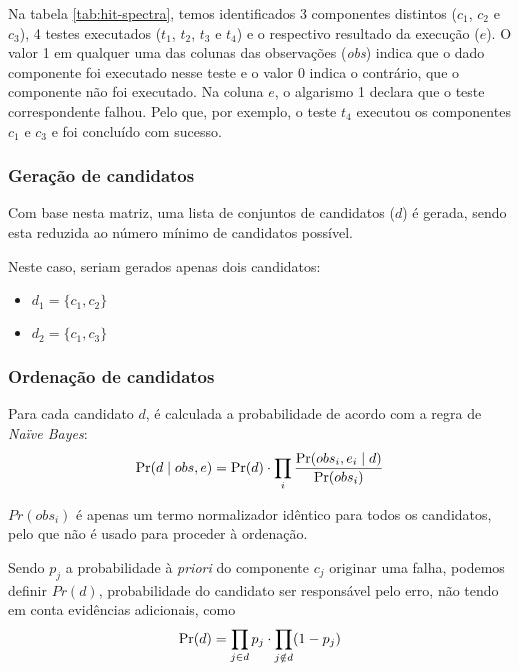 Na tabela \ref{tab:hit-spectra}, temos identificados 3 componentes distintos ($c_1$, $c_2$ e $c_3$), 4 testes executados ($t_1$, $t_2$, $t_3$ e $t_4$) e o respectivo resultado da execução ($e$). O valor 1 em qualquer uma das colunas das observações (\emph{obs}) indica que o dado componente foi executado nesse teste e o valor 0 indica o contrário, que o componente não foi executado. Na coluna $e$, o algarismo 1 declara que o teste correspondente falhou. 
Pelo que, por exemplo, o teste $t_4$ executou os componentes $c_1$ e $c_3$ e foi concluído com sucesso.


% 
%

\subsubsection{Geração de candidatos} 

Com base nesta matriz, uma lista de conjuntos de candidatos ($d$) é gerada, sendo esta reduzida ao número mínimo de candidatos possível. 

Neste caso, seriam gerados apenas dois candidatos:

\begin{itemize}
\item $d_1 = \{c_1, c_2\}$ 
\item $d_2 = \{c_1, c_3\}$ 
\end{itemize}

% 
%

\subsubsection{Ordenação de candidatos} 

Para cada candidato $d$, é calculada a probabilidade de acordo com a regra de \emph{Naïve Bayes}:
%
\begin{equation}
	\mbox{Pr}(d\mid obs,e) =  \mbox{Pr}(d) \cdot \prod_{i}\frac{\mbox{Pr}(obs_i, e_i \mid d)}{\mbox{Pr}(obs_i)}
\end{equation}


$Pr(obs_i)$ é apenas um termo normalizador idêntico para todos os candidatos, pelo que não é usado para proceder à ordenação.

Sendo $p_j$ a probabilidade à \emph{priori} do componente $c_j$ originar uma falha, podemos definir $Pr(d)$, probabilidade do candidato ser responsável pelo erro, não tendo em conta evidências adicionais, como
%
\begin{equation}
  \mbox{Pr}(d) = \prod_{j \in d} p_j \cdot \prod_{j \notin d} (1 - p_j)
\end{equation}


